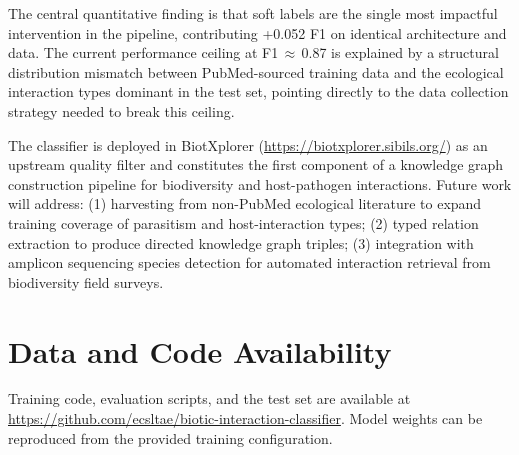 \documentclass[12pt,a4paper]{article}
\begin{document}
The central quantitative finding is that soft labels are the single most
impactful intervention in the pipeline, contributing +0.052 F1 on identical
architecture and data. The current performance ceiling at F1\,$\approx$\,0.87
is explained by a structural distribution mismatch between PubMed-sourced
training data and the ecological interaction types dominant in the test set,
pointing directly to the data collection strategy needed to break this ceiling.

The classifier is deployed in BiotXplorer
(\url{https://biotxplorer.sibils.org/}) as an upstream quality filter
and constitutes the first component of a knowledge graph construction
pipeline for biodiversity and host-pathogen interactions. Future work
will address: (1) harvesting from non-PubMed ecological literature to
expand training coverage of parasitism and host-interaction types;
(2) typed relation extraction to produce directed knowledge graph triples;
(3) integration with amplicon sequencing species detection for automated
interaction retrieval from biodiversity field surveys.

\section*{Data and Code Availability}

Training code, evaluation scripts, and the test set are available at
\url{https://github.com/ecsltae/biotic-interaction-classifier}.
Model weights can be reproduced from the provided training configuration.



\end{document}
